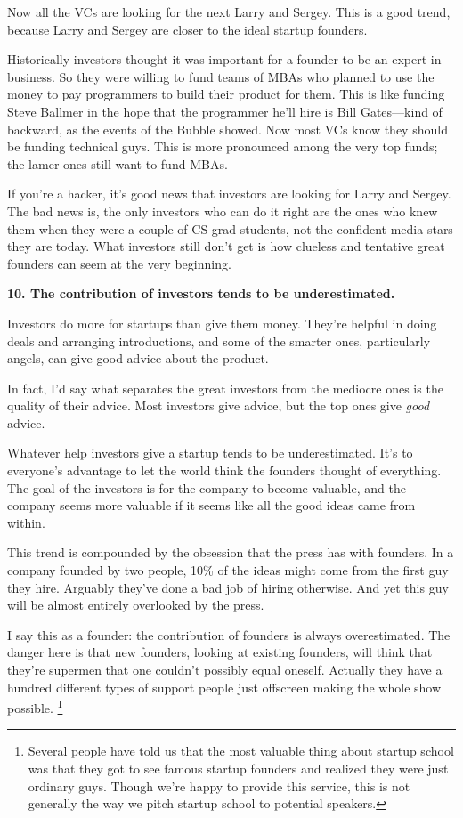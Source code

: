 \documentclass[12pt]{book}
\begin{document}
Now all the VCs are looking for the next Larry and Sergey. This is a
good trend, because Larry and Sergey are closer to the ideal startup
founders.

Historically investors thought it was important for a founder to be an
expert in business. So they were willing to fund teams of MBAs who
planned to use the money to pay programmers to build their product for
them. This is like funding Steve Ballmer in the hope that the programmer
he'll hire is Bill Gates---kind of backward, as the events of the Bubble
showed. Now most VCs know they should be funding technical guys. This is
more pronounced among the very top funds; the lamer ones still want to
fund MBAs.

If you're a hacker, it's good news that investors are looking for Larry
and Sergey. The bad news is, the only investors who can do it right are
the ones who knew them when they were a couple of CS grad students, not
the confident media stars they are today. What investors still don't get
is how clueless and tentative great founders can seem at the very
beginning.

\textbf{10. The contribution of investors tends to be underestimated.}

Investors do more for startups than give them money. They're helpful in
doing deals and arranging introductions, and some of the smarter ones,
particularly angels, can give good advice about the product.

In fact, I'd say what separates the great investors from the mediocre
ones is the quality of their advice. Most investors give advice, but the
top ones give \emph{good} advice.

Whatever help investors give a startup tends to be underestimated. It's
to everyone's advantage to let the world think the founders thought of
everything. The goal of the investors is for the company to become
valuable, and the company seems more valuable if it seems like all the
good ideas came from within.

This trend is compounded by the obsession that the press has with
founders. In a company founded by two people, 10\% of the ideas might
come from the first guy they hire. Arguably they've done a bad job of
hiring otherwise. And yet this guy will be almost entirely overlooked by
the press.

I say this as a founder: the contribution of founders is always
overestimated. The danger here is that new founders, looking at existing
founders, will think that they're supermen that one couldn't possibly
equal oneself. Actually they have a hundred different types of support
people just offscreen making the whole show possible.
\footnote{Several people have told us that the most valuable thing about
\href{http://startupschool.org}{startup school} was that they got to see
famous startup founders and realized they were just ordinary guys.
Though we're happy to provide this service, this is not generally the
way we pitch startup school to potential speakers.}
\end{document}
